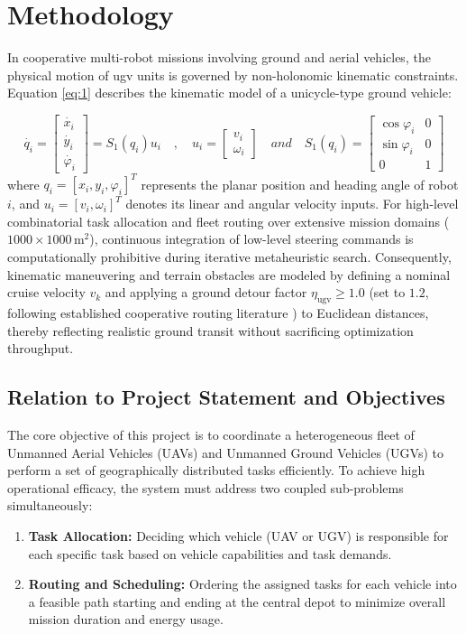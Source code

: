\chapter{Methodology}\label{chap:Methodology}

In cooperative multi-robot missions involving ground and aerial vehicles, the physical motion of \ac{ugv} units is governed by non-holonomic kinematic constraints. Equation \eqref{eq:1} describes the kinematic model of a unicycle-type ground vehicle:

\begin{equation} \label{eq:1}
\dot{q_i} = 
\begin{bmatrix}
	\dot{x_i}\\
	\dot{y_i}\\
	\dot{\varphi_i}
\end{bmatrix}
=
S_{1}(q_i)u_i
 \quad , \quad
  u_i = 
\begin{bmatrix}
	v_i\\
	\omega_i
\end{bmatrix}
 \quad and \quad
S_{1}(q_i) = 
\begin{bmatrix}
	\cos\varphi_i & 0\\
	\sin\varphi_i & 0\\
	0 & 1
\end{bmatrix}
\end{equation}
where $q_i = [x_i, y_i, \varphi_i]^T$ represents the planar position and heading angle of robot $i$, and $u_i = [v_i, \omega_i]^T$ denotes its linear and angular velocity inputs. For high-level combinatorial task allocation and fleet routing over extensive mission domains ($1000 \times 1000\,\text{m}^2$), continuous integration of low-level steering commands is computationally prohibitive during iterative metaheuristic search. Consequently, kinematic maneuvering and terrain obstacles are modeled by defining a nominal cruise velocity $v_k$ and applying a ground detour factor $\eta_{\text{ugv}} \ge 1.0$ (set to $1.2$, following established cooperative routing literature \cite{wang}) to Euclidean distances, thereby reflecting realistic ground transit without sacrificing optimization throughput.

\section{Relation to Project Statement and Objectives}
The core objective of this project is to coordinate a heterogeneous fleet of Unmanned Aerial Vehicles (UAVs) and Unmanned Ground Vehicles (UGVs) to perform a set of geographically distributed tasks efficiently. To achieve high operational efficacy, the system must address two coupled sub-problems simultaneously:
\begin{enumerate}
    \item \textbf{Task Allocation:} Deciding which vehicle (UAV or UGV) is responsible for each specific task based on vehicle capabilities and task demands.
    \item \textbf{Routing and Scheduling:} Ordering the assigned tasks for each vehicle into a feasible path starting and ending at the central depot to minimize overall mission duration and energy usage.
\end{enumerate}

